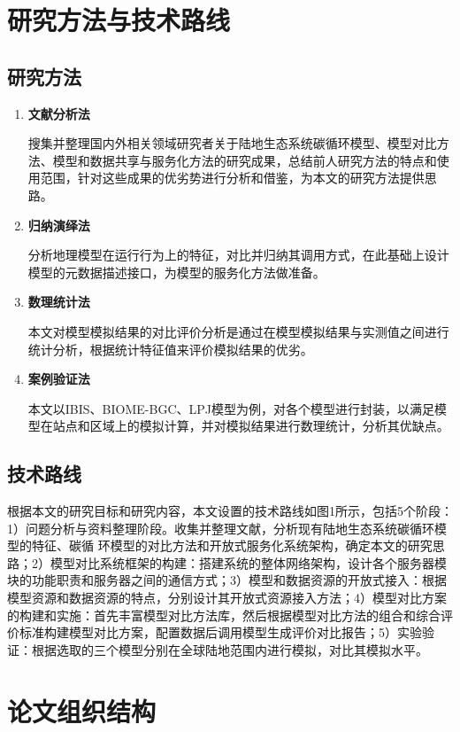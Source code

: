 \section{研究方法与技术路线}

\subsection{研究方法}
\begin{enumerate}[(1)]
\item \textbf{文献分析法}

搜集并整理国内外相关领域研究者关于陆地生态系统碳循环模型、模型对比方法、模型和数据共享与服务化方法的研究成果，总结前人研究方法的特点和使用范围，针对这些成果的优劣势进行分析和借鉴，为本文的研究方法提供思路。

\item \textbf{归纳演绎法}

分析地理模型在运行行为上的特征，对比并归纳其调用方式，在此基础上设计模型的元数据描述接口，为模型的服务化方法做准备。

\item \textbf{数理统计法}

本文对模型模拟结果的对比评价分析是通过在模型模拟结果与实测值之间进行统计分析，根据统计特征值来评价模拟结果的优劣。

\item \textbf{案例验证法}

本文以IBIS、BIOME-BGC、LPJ模型为例，对各个模型进行封装，以满足模型在站点和区域上的模拟计算，并对模拟结果进行数理统计，分析其优缺点。
\end{enumerate}


\subsection{技术路线}
根据本文的研究目标和研究内容，本文设置的技术路线如图1所示，包括5个阶段：1）问题分析与资料整理阶段。收集并整理文献，分析现有陆地生态系统碳循环模型的特征、碳循 环模型的对比方法和开放式服务化系统架构，确定本文的研究思路；2）模型对比系统框架的构建：搭建系统的整体网络架构，设计各个服务器模块的功能职责和服务器之间的通信方式；3）模型和数据资源的开放式接入：根据模型资源和数据资源的特点，分别设计其开放式资源接入方法；4）模型对比方案的构建和实施：首先丰富模型对比方法库，然后根据模型对比方法的组合和综合评价标准构建模型对比方案，配置数据后调用模型生成评价对比报告；5）实验验证：根据选取的三个模型分别在全球陆地范围内进行模拟，对比其模拟水平。

\section{论文组织结构}
